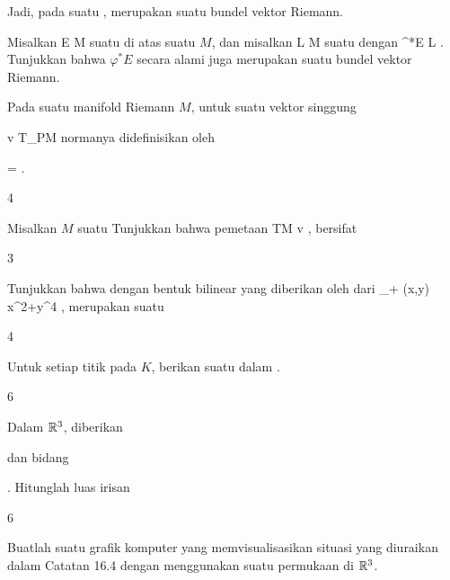 Jadi, pada suatu
,
merupakan suatu bundel vektor Riemann.

{}
{

Misalkan
 { E } { M
} {}
suatu
di atas suatu
$M$, dan misalkan
\maabb {\varphi} { L } { M
} {}
suatu
dengan
\maabb {} {\varphi^*E} {L
} {.}
Tunjukkan bahwa $\varphi^*E$ secara alami juga merupakan suatu bundel vektor Riemann.

}
{} {}


Pada suatu manifold Riemann $M$, untuk suatu vektor singgung

\mavergleichskette
{\vergleichskette
{ v
}
{ \in }{ T_PM
}
{  }{
}
{    }{
}
{   }{
}
}
{}{}{}
normanya didefinisikan oleh

\mavergleichskette
{\vergleichskette
{  \Vert
}
{ = }{ 
}
{  }{
}
{    }{
}
{   }{
}
}
{}{}{.}

{4}
{

Misalkan $M$ suatu
Tunjukkan bahwa pemetaan
\maabbeledisp {} {TM} {\R
} { v } {  \Vert
} {,}
bersifat

}
{} {}

{3}
{

Tunjukkan bahwa
\mathl{\R \times \R_+}{} dengan bentuk bilinear yang diberikan oleh
 dari
 {\R \times \R_+} {\R
} {(x,y)} { x^2+y^4
} {,}
merupakan suatu

}
{} {}

{4}
{

Untuk setiap titik
 pada
$K$, berikan suatu
dalam
 {} {.}

}
{} {}

{6}
{

Dalam ${\mathbb R}^3$, diberikan

 {  }
dan bidang

 {  }.
Hitunglah luas irisan

}
{} {}

{6}
{

Buatlah suatu grafik komputer yang memvisualisasikan situasi yang diuraikan dalam
Catatan 16.4
dengan menggunakan suatu permukaan di ${\mathbb R}^3$.

}
{} {}
